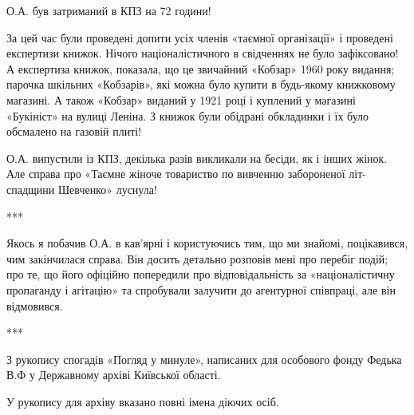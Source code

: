 О.А. був затриманий в КПЗ на 72 години!

За цей час були проведені допити усіх членів «таємної організації» і проведені
експертизи книжок. Нічого націоналістичного в свідченнях не було зафіксовано! А
експертиза книжок, показала, що це звичайний «Кобзар» 1960 року видання;
парочка шкільних «Кобзарів», які можна було купити в будь-якому книжковому
магазині. А також «Кобзар» виданий у 1921 році і куплений у магазині «Букініст»
на вулиці Леніна. З книжок були обідрані обкладинки і їх було обсмалено на
газовій плиті!

О.А. випустили із КПЗ, декілька разів викликали на бесіди, як і інших жінок.
Але справа про «Таємне жіноче товариство по вивченню забороненої літ-спадщини
Шевченко» луснула!

***

Якось я побачив О.А. в кав'ярні і користуючись тим, що ми знайомі, поцікавився,
чим закінчилася справа. Він досить детально розповів мені про перебіг подій;
про те, що його офіційно попередили про відповідальність за «націоналістичну
пропаганду і агітацію» та спробували залучити до агентурної співпраці, але він
відмовився. 

***

З рукопису спогадів «Погляд у минуле», написаних для особового фонду Федька В.Ф
у Державному архіві Київської області.

У рукопису для архіву вказано повні імена діючих осіб.

